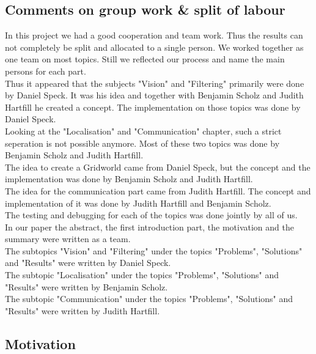 \documentclass[lnicst,a4paper]{svmultln}
\begin{document}
\subsection{Comments on group work \& split of labour}
In this project we had a good cooperation and team work. Thus the results can not completely be split and allocated to a single person. We worked together as one team on most topics. Still we reflected our process and name the main persons for each part.
\\
Thus it appeared that the subjects "Vision" and "Filtering" primarily were done by Daniel Speck. It was his idea and together with Benjamin Scholz and Judith Hartfill he created a concept. The implementation on those topics was done by Daniel Speck.
\\
Looking at the "Localisation" and "Communication" chapter, such a strict seperation is not possible anymore. Most of these two topics was done by Benjamin Scholz and Judith Hartfill.
\\
The idea to create a Gridworld came from Daniel Speck, but the concept and the implementation was done by Benjamin Scholz and Judith Hartfill.
\\
The idea for the communication part came from Judith Hartfill. The concept and implementation of it was done by Judith Hartfill and Benjamin Scholz. 
\\
The testing and debugging for each of the topics was done jointly by all of us.
\\
In our paper the abstract, the first introduction part, the motivation and the summary were written as a team.
\\
The subtopics "Vision" and "Filtering" under the topics "Problems", "Solutions" and "Results" were written by Daniel Speck.
\\
The subtopic "Localisation" under the topics "Problems", "Solutions" and "Results" were written by Benjamin Scholz.
\\
The subtopic "Communication" under the topics "Problems", "Solutions" and "Results" were written by Judith Hartfill.





\subsection{Motivation}
\end{document}
